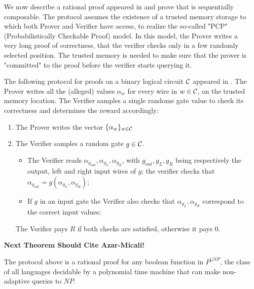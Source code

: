 \begin{comment}
In this subsection we:
- describe PCP's protocol by AM
- describe certain assumptions on cost
- we prove that it is a Sequential Rational Proofs
\end{comment}

We now describe a rational proof appeared in \cite{am1} and prove that is sequentially composable.
The protocol assumes the existence of a trusted memory storage to which both 
Prover and Verifier have access, to realize the so-called "PCP" (Probabilistically Checkable Proof) model. In this model, the Prover 
writes a very long proof of correctness, that the verifier checks only in a few randomly selected position. The trusted memory is needed to 
make sure that the prover is "committed" to the proof before the verifier starts querying it. 

The following protocol for proofs on a binary logical circuit $\cal C$ 
appeared  in  \cite{am1}. The Prover writes all the (alleged) values $\alpha_w$ for every wire in $w \in {\cal C}$, 
on the trusted memory location. The Verifier 
samples a single randome gate value to check its correctness and determines the reward accordingly:
\begin{enumerate}
\item The Prover writes the vector $\{ \alpha_w\}_{w \in {\cal C}}$
\item The Verifier samples a random gate $g \in \cal C$.
\begin{itemize}
\item  The Verifier reads $\alpha_{g_{out}}, \alpha_{g_L}, \alpha_{g_R}$, with $g_{out}, g_L, g_R$ being respectively the output, left and right 
input wires of $g$; the verifier checks that $\alpha_{g_{out}} = g(\alpha_{g_L}, 
\alpha_{g_R})$;
\item If $g$ in an input gate the Verifier also checks that  $\alpha_{g_L}, \alpha_{g_R}$ correspond to the correct input values;
\end{itemize}
The Verifier pays $R$ if both checks are satisfied, otherwise it pays $0$.
\end{enumerate}

\XXX \textbf{Next Theorem Should Cite Azar-Micali!} %
\begin{theorem}
The protocol above is a rational proof for any boolean function in $
P^{||NP}$, the class of all languages decidable by a polynomial time machine 
that can make non-adaptive queries to $NP$.
\end{theorem}

